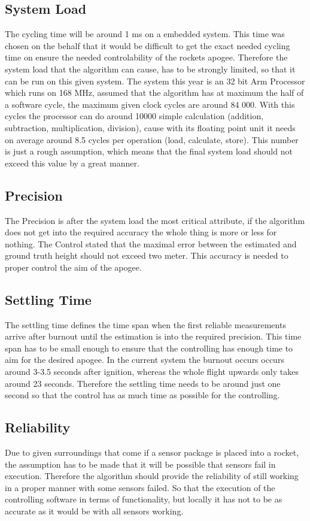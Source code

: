  \subsection{System Load}
 The cycling time will be around 1 ms on a embedded system. This time was chosen on the behalf that it would be difficult to get the exact needed cycling time on ensure the needed controlability of the rockets apogee.
 Therefore the system load that the algorithm can cause, has to be strongly limited, so that it can be run on this given system. 
 The system this year is an 32 bit Arm Processor which runs on 168 MHz, assumed that the algorithm has at maximum the half of a software cycle, the maximum given clock cycles are around 84 000.
 With this cycles the processor can do around 10000 simple calculation (addition, subtraction, multiplication, division),
 cause with its floating point unit it needs on average around 8.5 cycles per operation (load, calculate, store). 
 This number is just a rough assumption, which means that the final system load should not exceed this value by a great manner.
 
 \subsection{Precision}
 The Precision is after the system load the most critical attribute, if the algorithm does not get into the required accuracy the whole thing is more or less for nothing.
 The Control stated that the maximal error between the estimated and ground truth height should not exceed two meter. This accuracy is needed to proper control the aim of the apogee.
 
 \subsection{Settling Time}
 The settling time defines the time span when the first reliable measurements arrive after burnout until the estimation is into the required precision.
 This time span has to be small enough to ensure that the controlling has enough time to aim for the desired apogee. In the current system the burnout occurs 
 occurs around 3-3.5 seconds after ignition, whereas the whole flight upwards only takes around 23 seconds. Therefore the settling time needs to be around just
 one second so that the control has as much time as possible for the controlling.
 
 \subsection{Reliability}
 Due to given surroundings that come if a sensor package is placed into a rocket, the assumption has to be made that it will be possible that sensors fail in execution.
 Therefore the algorithm should provide the reliability of still working in a proper manner with some sensors failed. So that the execution of the controlling software
 in terms of functionality, but locally it has not to be as accurate as it would be with all sensors working.


